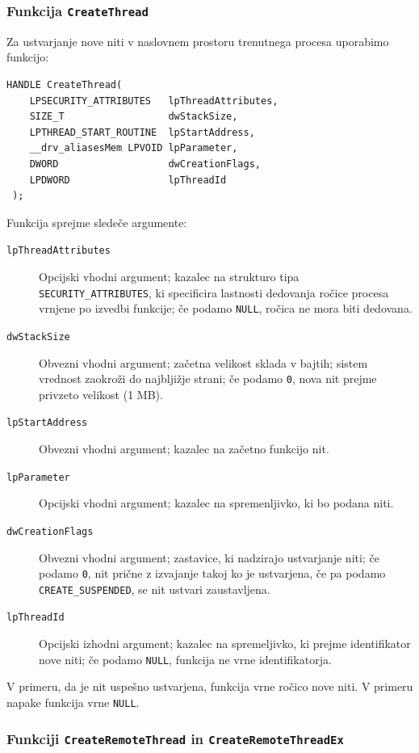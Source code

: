 \documentclass[a4paper,12pt,openright]{book}
\begin{document}
\subsubsection{Funkcija \texttt{CreateThread}}

Za ustvarjanje nove niti v naslovnem prostoru trenutnega procesa uporabimo funkcijo:
\begin{lstlisting}[style=func]
 HANDLE CreateThread(
	LPSECURITY_ATTRIBUTES   lpThreadAttributes,
	SIZE_T                  dwStackSize,
	LPTHREAD_START_ROUTINE  lpStartAddress,
	__drv_aliasesMem LPVOID lpParameter,
	DWORD                   dwCreationFlags,
	LPDWORD                 lpThreadId
 );
\end{lstlisting}

Funkcija sprejme sledeče argumente:
\begin{description}
	\item[\texttt{lpThreadAttributes}] Opcijski vhodni argument; kazalec na strukturo tipa \texttt{SECURITY\_ATTRIBUTES}, ki specificira lastnosti dedovanja ročice procesa vrnjene po izvedbi funkcije; če podamo \texttt{NULL}, ročica ne mora biti dedovana.
	\item[\texttt{dwStackSize}] Obvezni vhodni argument; začetna velikost sklada v bajtih; sistem vrednost zaokroži do najbljižje strani; če podamo \texttt{0}, nova nit prejme privzeto velikost (1 MB).
	\item[\texttt{lpStartAddress}] Obvezni vhodni argument; kazalec na začetno funkcijo nit.
	\item[\texttt{lpParameter}] Opcijski vhodni argument; kazalec na spremenljivko, ki bo podana niti.
	\item[\texttt{dwCreationFlags}] Obvezni vhodni argument; zastavice, ki nadzirajo ustvarjanje niti; če podamo \texttt{0}, nit prične z izvajanje takoj ko je ustvarjena, če pa podamo \texttt{CREATE\_SUSPENDED}, se nit ustvari zaustavljena.
	\item[\texttt{lpThreadId}] Opcijski izhodni argument; kazalec na spremeljivko, ki prejme identifikator nove niti; če podamo \texttt{NULL}, funkcija ne vrne identifikatorja.
\end{description}

V primeru, da je nit uspešno ustvarjena, funkcija vrne ročico nove niti.
V primeru napake funkcija vrne \texttt{NULL}.

\subsubsection{Funkciji \texttt{CreateRemoteThread} in \texttt{CreateRemoteThreadEx}}
\end{document}
